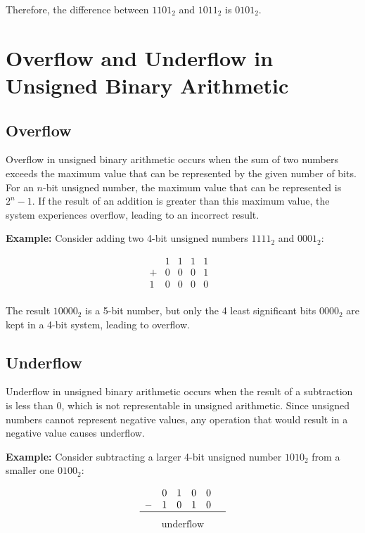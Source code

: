 \documentclass[12pt,openany, tikz,border=10pt]{book}
\begin{document}
	
	Therefore, the difference between $1101_2$ and $1011_2$ is $0101_2$.
	
	\section{Overflow and Underflow in Unsigned Binary Arithmetic}
	
	\subsection{Overflow}
	
	Overflow in unsigned binary arithmetic occurs when the sum of two numbers exceeds the maximum value that can be represented by the given number of bits. For an \(n\)-bit unsigned number, the maximum value that can be represented is \(2^n - 1\). If the result of an addition is greater than this maximum value, the system experiences overflow, leading to an incorrect result.
	
	\textbf{Example:} Consider adding two 4-bit unsigned numbers \(1111_2\) and \(0001_2\):
	
	\[
		\begin{array}{cccccc}
			  & 1 & 1 & 1 & 1 &   \\
			+ & 0 & 0 & 0 & 1 &   \\
			\hline
			1 & 0 & 0 & 0 & 0 &   \\
		\end{array}
	\]
	
	The result \(10000_2\) is a 5-bit number, but only the 4 least significant bits \(0000_2\) are kept in a 4-bit system, leading to overflow.
	\newpage
	\subsection{Underflow}
	
	Underflow in unsigned binary arithmetic occurs when the result of a subtraction is less than 0, which is not representable in unsigned arithmetic. Since unsigned numbers cannot represent negative values, any operation that would result in a negative value causes underflow.
	
	\textbf{Example:} Consider subtracting a larger 4-bit unsigned number \(1010_2\) from a smaller one \(0100_2\):
	
	\[
		\begin{array}{cccccc}
			  & 0 & 1 & 0 & 0 &   \\
			- & 1 & 0 & 1 & 0 &   \\
			\hline
		\end{array}\]
		\vspace{-15px}
		\begin{align*}
			\text{underflow} 
		\end{align*} 
		
\end{document}
